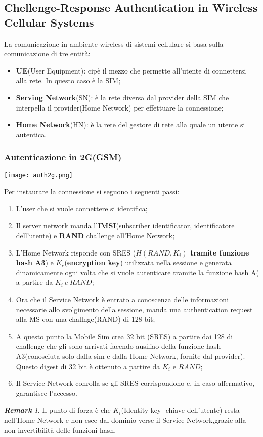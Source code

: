 \documentclass{article}
\theoremstyle{remark}
\newtheorem*{remark}{\textbf{Remark}}
\begin{document}
\subsection{Chellenge-Response Authentication in Wireless Cellular Systems}
La comunicazione in ambiente wireless di sistemi cellulare si basa sulla comunicazione di tre entità:\begin{itemize}
    \item \textbf{UE}(User Equipment): cipè il mezzo che permette all'utente di connettersi alla rete. In questo caso è la SIM;
    \item \textbf{Serving Network}(SN): è la rete diversa dal provider della SIM che interpella il provider(Home Network) per effettuare la connessione;
    \item \textbf{Home Network}(HN): è la rete del gestore di rete alla quale un utente si autentica.
\end{itemize}
\subsubsection{Autenticazione in 2G(GSM)}
\begin{center}
    \texttt{[image: auth2g.png]}
\end{center}
Per instaurare la connessione si seguono i seguenti passi:\begin{enumerate}
    \item L'user che si vuole connettere si identifica;
    \item Il server network manda l'\textbf{IMSI}(subscriber identificator, identificatore dell'utente) e \textbf{RAND} challenge all'Home Network;
    \item L'Home Network risponde con SRES (\textbf{$H(RAND,K_i)$ tramite funzione hash A3}) e $K_c$(\textbf{encryption key}) utilizzata nella sessione e generata dinamicamente ogni volta che si vuole autenticare tramite la funzione hash A( a partire da $K_i \ e\ RAND$;
    \item Ora che il Service Network è entrato a conoscenza delle informazioni necessarie allo svolgimento della sessione, manda una authentication request alla MS con una challnge(RAND) di 128 bit;
    \item A questo punto la Mobile Sim crea 32 bit (SRES) a partire dai 128 di challenge che gli sono arrivati facendo ausiliao della funzione hash A3(conosciuta solo dalla sim e dalla Home Network, fornite dal provider). Questo digest di 32 bit è ottenuto a partire da $K_i$ e $RAND$;
    \item Il Service Network conrolla se gli SRES corrispondono e, in caso affermativo, garantisce l'accesso.
\end{enumerate}
\begin{remark}
Il punto di forza è che $K_i$(Identity key- chiave dell'utente) resta nell'Home Network e non esce dal dominio verse il Service Network,grazie alla non invertibilità delle funzioni hash.
\end{remark}
\end{document}
